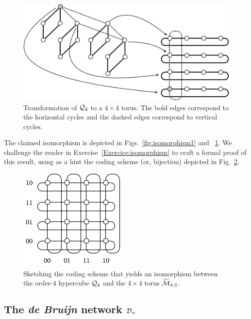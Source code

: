 \begin{figure}[hbt]
\begin{center}
       \includegraphics[scale=0.5]{FiguresGraph/Isomorphism2}
       \caption{Transformation of $\mbox{$\cal Q$}_4$ to a $4 \times 4$ torus.
       The bold edges correspond to the horizontal cycles and the dashed edges correspond to vertical cycles.}
  \label{fig:isomorphism2}
\end{center}
\end{figure}

The claimed isomorphism is depicted in Figs.~\ref{fig:isomorphism1} and ~\ref{fig:isomorphism2}. 
We challenge the reader in Exercise~\ref{Exercice:isomorphism} to craft a formal proof of this result,
using as a hint the coding scheme (or, bijection) depicted in Fig.~\ref{fig:toruslabel}.
\begin{figure}[hbt]
\begin{center}
       \includegraphics[scale=0.6]{FiguresGraph/toruslabel}
\caption{Sketching the coding scheme that yields an isomorphism
  between the order-$4$ hypercube $\mbox{$\cal Q$}_4$ and the $4 \times                          
4$ torus $\widetilde{\mbox{$\cal M$}}_{4,4}$.}
  \label{fig:toruslabel}
\end{center}
\end{figure}


\subsection{The {\it de Bruijn} network $\mbox{$\cal D$}_n$}
\label{sec:deBruijn}

